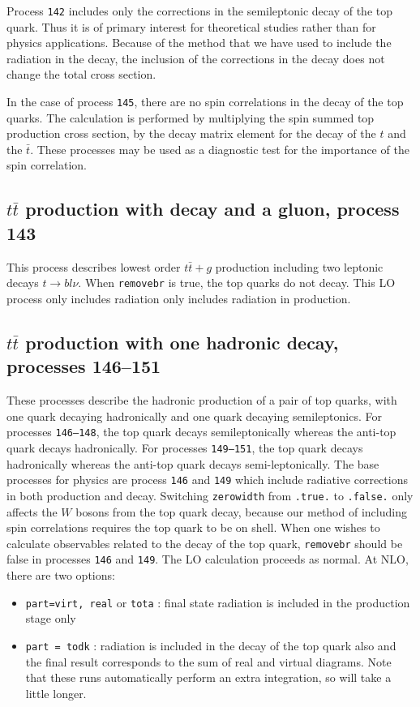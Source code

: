 \documentclass[12pt]{article}
\begin{document}
Process {\tt 142} includes only the corrections in
the semileptonic decay of the top quark. Thus it is of primary
interest for theoretical studies rather than for physics applications.  
Because of the method that we have used to include the radiation in the decay,
the inclusion of the corrections in the decay does not change the
total cross section.


In the case of process {\tt 145}, there are no spin correlations in
the decay of the top quarks. The calculation is performed by
multiplying the spin summed top production cross section, by the decay
matrix element for the decay of the $t$ and the $\bar{t}$. These
processes may be used as a diagnostic test for the importance of the
spin correlation.



\subsection{$t\bar{t}$ production with decay and a gluon, process 143}
This process describes lowest order $t \bar{t}+g$ production 
including two leptonic decays $t \to b l \nu$. 
When {\tt removebr} is true, the top quarks do not decay.
This LO process only includes radiation only includes radiation in production.

\subsection{$t\bar{t}$ production with one hadronic decay, processes 146--151}

These processes describe the hadronic production of a pair of top
quarks, with one quark decaying hadronically and one quark decaying
semileptonics.  For processes {\tt 146--148}, the top quark decays
semileptonically whereas the anti-top quark decays hadronically.  For
processes {\tt 149--151}, the top quark decays hadronically whereas the
anti-top quark decays semi-leptonically.  The base processes for
physics are process {\tt 146} and {\tt 149} which include
radiative corrections in both production and decay.  Switching {\tt zerowidth} from 
{\tt .true.} to {\tt .false.} only affects the $W$ bosons from the top
quark decay, because our method of including spin correlations
requires the top quark to be on shell.
When one wishes to calculate observables related to the decay of the top
quark, {\tt removebr} should be false in processes {\tt 146} and {\tt 149}.
The LO calculation proceeds as normal. At NLO, there are two options:
\begin{itemize}
\item {\tt part=virt, real} or {\tt tota} : final state radiation is included
in the production stage only
\item {\tt part = todk} : radiation is included in the decay of the top
quark also and the final result corresponds to the sum of real and virtual
diagrams. 
Note that these runs automatically perform an extra integration, so
will take a little longer.
\end{itemize}
\end{document}
